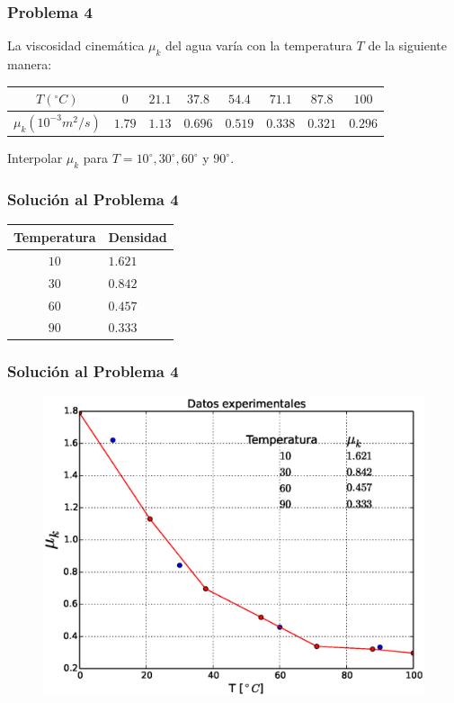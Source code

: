 \begin{frame}
\frametitle{Problema 4}
La viscosidad cinemática $\mu_{k}$ del agua varía con la temperatura $T$ de la siguiente manera:
\begin{table}[H]
	\fontsize{10}{10}\selectfont
			\begin{tabulary}{15cm}{c | c | c | c | c | c | c | c }
				$T(^\circ C)$ & $0$ & $21.1$ & $37.8$ & $54.4$ & $71.1$ & $87.8$ & $100$ \\
				\midrule
				$\mu_{k} (10^{-3}m^{2}/s)$ & $1.79$ & $1.13$ & $0.696$ & $0.519$ & $0.338$ & $0.321$ & $0.296$ 
			\end{tabulary}
\end{table}
Interpolar $\mu_{k}$ para $T= 10^{\circ},30^{\circ},60^{\circ}$ y $90^{\circ}$.
\end{frame}
\begin{frame}
\frametitle{Solución al Problema 4}
\begin{center}
	 \begin{tabular}{c | l}
			Temperatura & Densidad \\ \hline
			$10$ & $1.621$ \\ \hline
			$30$ & $0.842$ \\ \hline
			$60$ & $0.457$ \\ \hline
			$90$ & $0.333$ 	 
	 \end{tabular}
\end{center}
\end{frame}
\begin{frame}
\frametitle{Solución al Problema 4}
\begin{figure}
	\centering
	\includegraphics[scale=0.5]{Imagenes/Problema4_01.eps} 
\end{figure}
\end{frame}
